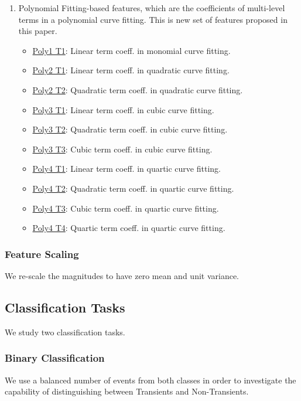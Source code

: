 \documentclass[a4paper,fleqn,usenatbib]{mnras}
\begin{document}
\begin{enumerate}
  \item Polynomial Fitting-based features, which are the coefficients of
    multi-level terms in a polynomial curve fitting. This is new set
    of features proposed in this paper. 
    \begin{itemize}
        \item \underline{Poly1 T1}: Linear term coeff. in monomial curve fitting.
        \item \underline{Poly2 T1}: Linear term coeff. in quadratic curve fitting.
        \item \underline{Poly2 T2}: Quadratic term coeff. in quadratic curve fitting.
        \item \underline{Poly3 T1}: Linear term coeff. in cubic curve fitting.
        \item \underline{Poly3 T2}: Quadratic term coeff. in cubic curve fitting.
        \item \underline{Poly3 T3}: Cubic term coeff. in cubic curve fitting.
        \item \underline{Poly4 T1}: Linear term coeff. in quartic curve fitting.
        \item \underline{Poly4 T2}: Quadratic term coeff. in quartic curve fitting.
        \item \underline{Poly4 T3}: Cubic term coeff. in quartic curve fitting.
        \item \underline{Poly4 T4}: Quartic term coeff. in quartic curve fitting.
    \end{itemize}    
\end{enumerate}


\subsubsection{Feature Scaling} \label{subsection_scaling}

We re-scale the magnitudes to have zero mean  and unit variance. 


\subsection{Classification Tasks} \label{subsection_classification}

We study two classification tasks.

\subsubsection{ Binary Classification}
We use a balanced number of events from both classes in order 
to investigate the capability of distinguishing between Transients
and Non-Transients.
\end{document}
